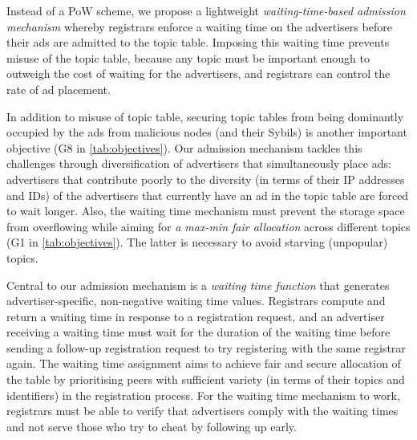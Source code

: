 Instead of a PoW scheme, we propose a lightweight \textit{waiting-time-based admission mechanism} whereby registrars enforce a waiting time on the advertisers before their ads are admitted to the topic table. Imposing this waiting time prevents misuse of the topic table, because any topic must be important enough to outweigh the cost of waiting for the advertisers, and registrars can control the rate of ad placement. 

In addition to misuse of topic table, securing topic tables from being dominantly occupied by the ads from malicious nodes (and their Sybils) is another important objective (G8 in \cref{tab:objectives}). Our admission mechanism tackles this challenges through diversification of advertisers that simultaneously place ads: advertisers that contribute poorly to the diversity (in terms of their IP addresses and IDs) of the advertisers that currently have an ad in the topic table are forced to wait longer. Also, the waiting time mechanism must prevent the storage space from overflowing while aiming for \textit{a max-min fair allocation} across different topics (G1 in \cref{tab:objectives}). The latter is necessary to avoid starving (unpopular) topics. %


Central to our admission mechanism is a \textit{waiting time function} that generates advertiser-specific, non-negative waiting time values. Registrars compute and return a waiting time in response to a registration request, and an advertiser receiving a waiting time must wait for the duration of the waiting time before sending a follow-up registration request to try registering with the same registrar again. The waiting time assignment aims to achieve fair and secure allocation of the table by prioritising peers with sufficient variety (in terms of their topics and identifiers) in the registration process. For the waiting time mechanism to work, registrars must be able to verify that advertisers comply with the waiting times and not serve those who try to cheat by following up early. 

